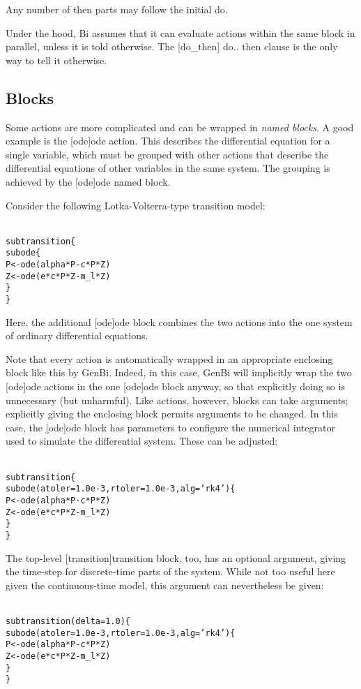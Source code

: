 Any number of {\sf then} parts may follow the initial {\sf do}.

Under the hood, Bi assumes that it can evaluate actions within the same block
in parallel, unless it is told otherwise. The \hyperref[hyper][do_then]{\sf
  do.. then} clause is the only way to tell it otherwise.

\subsection{Blocks}

Some actions are more complicated and can be wrapped in \emph{named blocks}. A
good example is the \hyperref[hyper][ode]{\sf ode} action. This
describes the differential equation for
a single variable, which must be grouped with other actions that describe the
differential equations of other variables in the same system. The grouping is
achieved by the \hyperref[hyper][ode]{\sf ode} named block.

Consider the following Lotka-Volterra-type transition
model:
\begin{alltt}{\sf
    sub transition \{
      sub ode \{
        P <- ode(alpha*P - c*P*Z)
        Z <- ode(e*c*P*Z - m_l*Z)
      \}
    \}
}\end{alltt}
Here, the additional \hyperref[hyper][ode]{\sf ode} block combines
the two actions into the one system of ordinary differential equations.

Note that every action is automatically wrapped in an appropriate enclosing
block like this by GenBi. Indeed, in this case, GenBi will implicitly wrap the
two \hyperref[hyper][ode]{\sf ode} actions in the one
\hyperref[hyper][ode]{\sf ode} block anyway, so that explicitly
doing so is unnecessary (but unharmful). Like actions, however, blocks can
take arguments; explicitly giving the enclosing block permits arguments to be
changed. In this case, the \hyperref[hyper][ode]{\sf ode} block has
parameters to configure the numerical integrator used to simulate the
differential system. These can be adjusted:
\begin{alltt}{\sf
    sub transition \{
      sub ode(atoler = 1.0e-3, rtoler = 1.0e-3, alg = 'rk4') \{
        P <- ode(alpha*P - c*P*Z)
        Z <- ode(e*c*P*Z - m_l*Z)
      \}
    \}
}\end{alltt}

The top-level \hyperref[hyper][transition]{\sf transition}
block, too, has an optional argument, giving the time-step for discrete-time
parts of the system. While not too useful here given the continuous-time
model, this argument can nevertheless be given:
\begin{alltt}{\sf
    sub transition(delta = 1.0) \{
      sub ode(atoler = 1.0e-3, rtoler = 1.0e-3, alg = 'rk4') \{
        P <- ode(alpha*P - c*P*Z)
        Z <- ode(e*c*P*Z - m_l*Z)
      \}
    \}
}\end{alltt}

